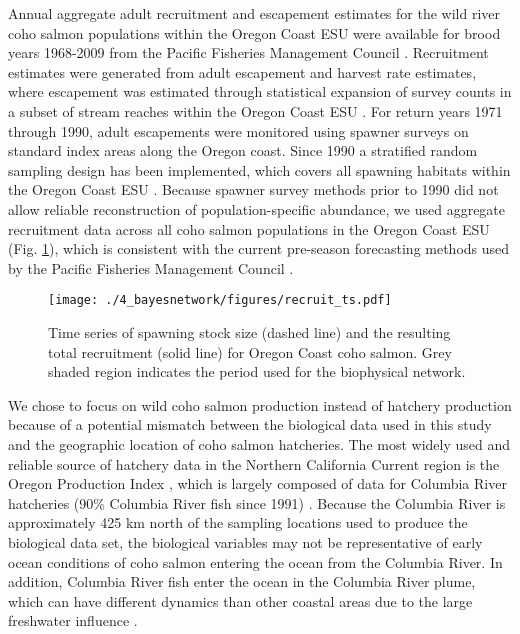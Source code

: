 Annual aggregate adult recruitment and escapement estimates for the wild river
coho salmon populations within the Oregon Coast ESU were available for brood
years 1968-2009 from the Pacific Fisheries Management Council \citep{PFMC2013,
Rupp2012}. Recruitment estimates were generated from adult escapement and
harvest rate estimates, where escapement was estimated through statistical
expansion of survey counts in a subset of stream reaches within the Oregon Coast
ESU \citep{Lewis2010}. For return years 1971 through 1990, adult escapements
were monitored using spawner surveys on standard index areas along the Oregon
coast. Since 1990 a stratified random sampling design has been implemented,
which covers all spawning habitats within the Oregon Coast ESU
\citep{Jacobs1998, Lewis2010}. Because spawner survey methods prior to 1990 did
not allow reliable reconstruction of population-specific abundance, we used
aggregate recruitment data across all coho salmon populations in the Oregon
Coast ESU (Fig. \ref{fig:bn:3}), which is consistent with the current pre-season
forecasting methods used by the Pacific Fisheries Management Council
\citep{PFMC2013}.

\begin{figure}[htbp]
  \centering \texttt{[image: ./4\_bayesnetwork/figures/recruit\_ts.pdf]}
  \caption[Time series of spawning stock size and the resulting
           total recruitment.]{Time series of spawning stock size (dashed line)
           and the resulting total recruitment (solid line) for Oregon Coast
           coho salmon. Grey shaded region indicates the period used for the
           biophysical network.}
  \label{fig:bn:3}
\end{figure}

We chose to focus on wild coho salmon production instead of hatchery production
because of a potential mismatch between the biological data used in this study
and the geographic location of coho salmon hatcheries. The most widely used and
reliable source of hatchery data in the Northern California Current region is
the Oregon Production Index \citep{Logerwell2003a, Koslow2002a, Cole2000a},
which is largely composed of data for Columbia River hatcheries (90\% Columbia
River fish since 1991) \citep{PFMC2013}. Because the Columbia River is
approximately 425 km north of the sampling locations used to produce the
biological data set, the biological variables may not be representative of early
ocean conditions of coho salmon entering the ocean from the Columbia River. In
addition, Columbia River fish enter the ocean in the Columbia River plume, which
can have different dynamics than other coastal areas due to the large freshwater
influence \citep{Hickey1998}.

